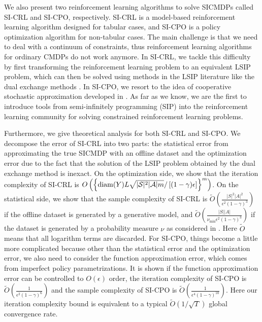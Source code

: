 We also present two reinforcement learning algorithms to solve SICMDPs called SI-CRL and SI-CPO, respectively.
SI-CRL is a model-based reinforcement learning algorithm designed for tabular cases, and SI-CPO is a policy optimization algorithm for non-tabular cases.
The main challenge is that we need to deal with a continuum of constraints, thus reinforcement learning algorithms for ordinary CMDPs do not work anymore.
In SI-CRL, we tackle this difficulty by first transforming the reinforcement learning problem to an equivalent LSIP problem, which can then be solved using methods in the LSIP literature like the dual exchange methods \citep{Hu1990,reemtsen1998numerical}.
In SI-CPO, we resort to the idea of cooperative stochastic approximation developed in \cite{lan2020algorithms, wei2020comirror}.
As far as we know, we are the first to introduce tools from semi-infinitely programming (SIP) into the reinforcement learning community for solving constrained reinforcement learning problems.

Furthermore, we give theoretical analysis for both SI-CRL and SI-CPO.
We decompose the error of SI-CRL into two parts: the statistical error from approximating the true SICMDP with an offline dataset and the optimization error due to the fact that the solution of the LSIP problem obtained by the dual exchange method is inexact.
On the optimization side, we show that the iteration complexity of SI-CRL is $O\left(\left\{\mathrm{diam}(Y)L\sqrt{|{\mathcal{S}}|^2|{\mathcal{A}}|m}/\left[(1-\gamma)\epsilon\right]\right\}^m\right)$.
On the statistical side, we show that the sample complexity of SI-CRL is $\widetilde O\left(\frac{|S|^2|A|^2}{\epsilon^2(1-\gamma)^3}\right)$ if the offline dataset is generated by a generative model, and $\widetilde O\left(\frac{|S||A|}{\nu_{\min} \epsilon^2(1-\gamma)^3}\right)$ if the dataset is generated by a probability measure $\nu$ as considered in \cite{chen2019information}.
Here $\widetilde O$ means that all logarithm terms are discarded.
For SI-CPO, things become a little more complicated because other than the statistical error and the optimization error, we also need to consider the function approximation error, which comes from imperfect policy parametrizations.
It is shown if the function approximation error can be controlled to $O(\epsilon)$ order, the iteration complexity of SI-CPO is $\widetilde{O}\left(\frac{1}{\epsilon^2(1-\gamma)^6}\right)$ and the sample complexity of SI-CPO is $\widetilde{O}(\frac{1}{\epsilon^4(1-\gamma)^{10}})$.
Here our iteration complexity bound is equivalent to a typical $\widetilde O(1/\sqrt{T})$ global convergence rate.

